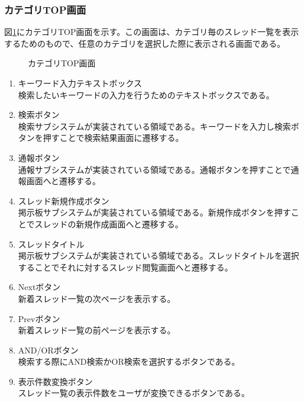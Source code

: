 \documentclass[a4j]{jarticle}
\begin{document}
\subsubsection{カテゴリTOP画面}
図\ref{fig:category_top}にカテゴリTOP画面を示す。この画面は、カテゴリ毎のスレッド一覧を表示するためのもので、任意のカテゴリを選択した際に表示される画面である。
\begin{figure}[H]
\centering
{}
\caption{カテゴリTOP画面}
\label{fig:category_top}
\end{figure}
\begin{enumerate}
  \renewcommand{\labelenumi}{\textcircled{\scriptsize \theenumi}}

\item キーワード入力テキストボックス\\
検索したいキーワードの入力を行うためのテキストボックスである。
\item 検索ボタン\\
検索サブシステムが実装されている領域である。キーワードを入力し検索ボタンを押すことで検索結果画面に遷移する。
\item 通報ボタン\\
通報サブシステムが実装されている領域である。通報ボタンを押すことで通報画面へと遷移する。
\item スレッド新規作成ボタン\\
掲示板サブシステムが実装されている領域である。新規作成ボタンを押すことでスレッドの新規作成画面へと遷移する。
\item スレッドタイトル\\
掲示板サブシステムが実装されている領域である。スレッドタイトルを選択することでそれに対するスレッド閲覧画面へと遷移する。
\item Nextボタン\\
新着スレッド一覧の次ページを表示する。
\item Prevボタン\\
新着スレッド一覧の前ページを表示する。
\item AND/ORボタン\\
検索する際にAND検索かOR検索を選択するボタンである。
\item 表示件数変換ボタン\\
スレッド一覧の表示件数をユーザが変換できるボタンである。

\end{enumerate}
\end{document}
